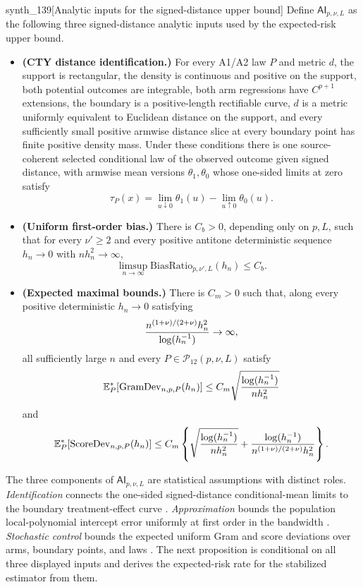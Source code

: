 \documentclass[11pt]{article}
\begin{document}
\begin{definitionv}{synth_139}[Analytic inputs for the signed-distance upper bound]
Define \(\mathsf{AI}_{p,\nu,L}\) as the following three signed-distance analytic inputs used by the expected-risk upper bound.
\begin{itemize}
\item \textbf{(CTY distance identification.)} For every A1/A2 law \(P\) and metric \(d\), the support is rectangular, the density is continuous and positive on the support, both potential outcomes are integrable, both arm regressions have \(C^{p+1}\) extensions, the boundary is a positive-length rectifiable curve, \(d\) is a metric uniformly equivalent to Euclidean distance on the support, and every sufficiently small positive armwise distance slice at every boundary point has finite positive density mass. Under these conditions there is one source-coherent selected conditional law of the observed outcome given signed distance, with armwise mean versions \(\theta_1,\theta_0\) whose one-sided limits at zero satisfy
\[
\tau_P(x)=\lim_{u\downarrow0}\theta_1(u)-\lim_{u\uparrow0}\theta_0(u).
\]
\item \textbf{(Uniform first-order bias.)} There is \(C_b>0\), depending only on \(p,L\), such that for every \(\nu'\ge2\) and every positive antitone deterministic sequence \(h_n\to0\) with \(nh_n^2\to\infty\),
\[
\limsup_{n\to\infty}\mathrm{BiasRatio}_{p,\nu',L}(h_n)\le C_b.
\]
\item \textbf{(Expected maximal bounds.)} There is \(C_m>0\) such that, along every positive deterministic \(h_n\to0\) satisfying
\[
{n^{(1+\nu)/(2+\nu)}h_n^2\over\log(h_n^{-1})}\to\infty,
\]
all sufficiently large \(n\) and every \(P\in\mathcal P_{12}(p,\nu,L)\) satisfy
\[
\mathbb E_P^*[\mathrm{GramDev}_{n,p,P}(h_n)]\le C_m\sqrt{{\log(h_n^{-1})\over nh_n^2}}
\]
and
\[
\mathbb E_P^*[\mathrm{ScoreDev}_{n,p,P}(h_n)]\le C_m\left\{\sqrt{{\log(h_n^{-1})\over nh_n^2}}+{\log(h_n^{-1})\over n^{(1+\nu)/(2+\nu)}h_n^2}\right\}.
\]
\end{itemize}
\end{definitionv}

The three components of \(\mathsf{AI}_{p,\nu,L}\) are statistical assumptions with distinct roles. \emph{Identification} connects the one-sided signed-distance conditional-mean limits to the boundary treatment-effect curve \citep{CattaneoTitiunikYu2026Distance}. \emph{Approximation} bounds the population local-polynomial intercept error uniformly at first order in the bandwidth \citep{Fan1996,Ruppert1994}. \emph{Stochastic control} bounds the expected uniform Gram and score deviations over arms, boundary points, and laws \citep{Vapnik1971,Pollard1984,VanderVaart1996}. The next proposition is conditional on all three displayed inputs and derives the expected-risk rate for the stabilized estimator from them.
\end{document}
